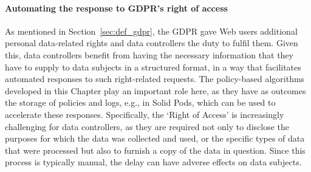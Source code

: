 \paragraph{Automating the response to GDPR's right of access}
As mentioned in Section~\ref{sec:def_gdpr}, the GDPR gave Web users additional personal data-related rights and data controllers the duty to fulfil them.
Given this, data controllers benefit from having the necessary information that they have to supply to data subjects in a structured format, in a way that facilitates automated responses to such right-related requests.
The policy-based algorithms developed in this Chapter play an important role here, as they have as outcomes the storage of policies and logs, e.g., in Solid Pods, which can be used to accelerate these responses.
Specifically, the `Right of Access' is increasingly challenging for data controllers, as they are required not only to disclose the purposes for which the data was collected and used, or the specific types of data that were processed but also to furnish a copy of the data in question.
Since this process is typically manual, the delay can have adverse effects on data subjects.

